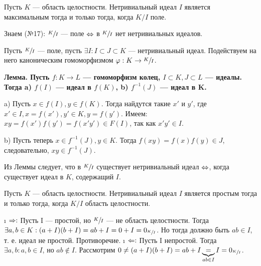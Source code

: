 \begin{problem}[21(4.6)]
Пусть $K$ --- область целостности. Нетривиальный идеал $I$ является максимальным тогда и только тогда, когда $K/I$ поле.
\end{problem}

\begin{solution}
Знаем (№17): \(\sfrac{K}{I}\) --- поле \(\Leftrightarrow\) в \(\sfrac{K}{I}\) нет нетривиальных идеалов.

Пусть \(\sfrac{K}{I}\) --- поле, пусть \(\exists I: I \subset J \subset K\) --- нетривиальный идеал. Подействуем на него каноническим гомоморфизмом \(\varphi: K \to \sfrac{K}{I}\).

\bf{Лемма.} Пусть \(f: K \to L\) --- гомоморфизм колец, \(I \subset K, J \subset L\) --- идеалы. Тогда a) \(f(I)\) --- идеал в \(f (K)\), b) \(f^{-1} (J)\) --- идеал в K.

\begin{solution}
a) Пусть $x \in f(I), y \in f(K)$. Тогда найдутся такие $x'$ и $y'$, где $x' \in I, x = f(x'), y' \in K, y = f(y')$.
    Имеем: $xy = f(x')f(y') = f (x' y') \in F(I)$, так как $x' y' \in I$.
    
b) Пусть теперь $x \in f^{-1}(J), y \in K$. Тогда $f(xy) = f(x)f(y) \in J$, следовательно, $xy \in f^{-1}(J)$.
\end{solution}

Из Леммы следует, что в \(\sfrac{K}{I}\) существует нетривиальный идеал \(\Leftrightarrow\), когда существует идеал в \(K\), содержащий \(I\).

\end{solution}

\begin{problem}[22(4.7)]
Пусть $K$ --- область целостности. Нетривиальный идеал $I$ является простым тогда и только тогда, когда $K/I$ область целостности.
\end{problem}

\begin{solution}

\begin{itemize}
\tightlist
\i
  \(\Rightarrow:\)
  Пусть I --- простой, но \(\sfrac{K}{I}\) --- не область целостности. Тогда \(\exists a, b \in K: (a+I)(b+I) = ab+I = 0+I = 0_{\sfrac{K}{I}}\). Но тогда должно быть \(ab \in I\), т. е. идеал не простой. Противоречие.
\i
  \(\Leftarrow:\)
  Пусть I непростой. Тогда \(\exists a, b: a, b \in I\), но \(ab \not\in I\). Рассмотрим \(0 \ne (a+I)(b+I) = ab + I \underbrace{=}_{ab \in I} I = 0_{\sfrac{K}{I}}\).
\end{itemize}

\end{solution}

